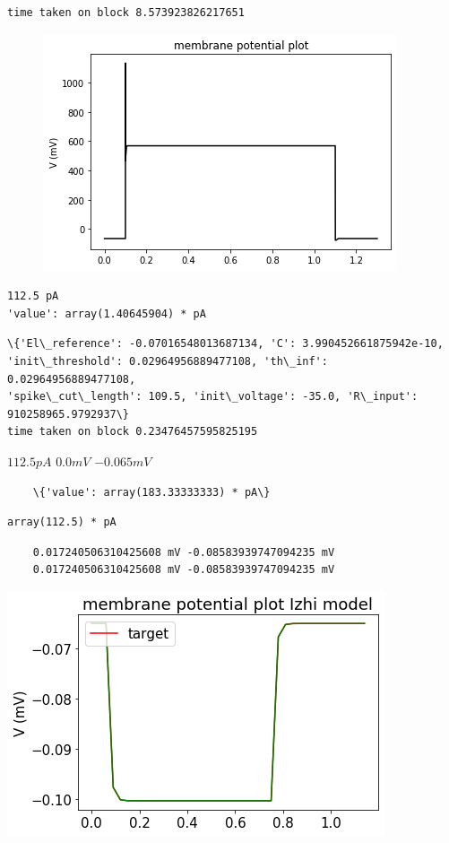    \begin{verbatim}
time taken on block 8.573923826217651
    \end{verbatim}


    \begin{center}
    \begin{figure}
    \includegraphics{figures/backend_check_files/backend_check_26_2}
    \end{figure}
    
    \end{center}
\begin{verbatim}
112.5 pA
'value': array(1.40645904) * pA
\end{verbatim}


\begin{verbatim}
\{'El\_reference': -0.07016548013687134, 'C': 3.990452661875942e-10,
'init\_threshold': 0.02964956889477108, 'th\_inf': 0.02964956889477108,
'spike\_cut\_length': 109.5, 'init\_voltage': -35.0, 'R\_input': 910258965.9792937\}
time taken on block 0.23476457595825195
\end{verbatim}

    


$ 112.5 pA $
$0.0 mV$ $-0.065 mV$

    \begin{verbatim}
    \{'value': array(183.33333333) * pA\}
    \end{verbatim}

\begin{verbatim}
array(112.5) * pA
\end{verbatim}


\begin{verbatim}
    0.017240506310425608 mV -0.08583939747094235 mV
    0.017240506310425608 mV -0.08583939747094235 mV
\end{verbatim}

    \begin{center}
    \includegraphics{figures/backend_check_files/backend_check_32_2.png}
    \end{center}
